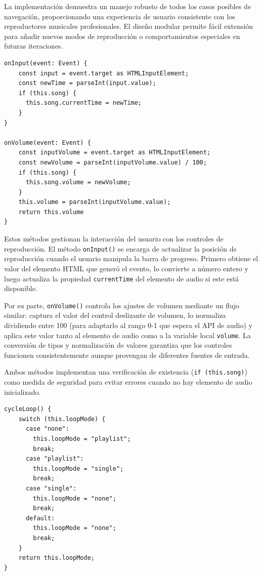 \documentclass[11pt, a4paper]{article}
\begin{document}
                La implementación demuestra un manejo robusto de todos los casos posibles de navegación, proporcionando una experiencia de usuario consistente con los reproductores musicales profesionales. El diseño modular permite fácil extensión para añadir nuevos modos de reproducción o comportamientos especiales en futuras iteraciones.

                \begin{lstlisting}[caption={Control de tiempo y volumen}]
onInput(event: Event) {
    const input = event.target as HTMLInputElement;
    const newTime = parseInt(input.value);
    if (this.song) {
      this.song.currentTime = newTime;
    }
}

onVolume(event: Event) {
    const inputVolume = event.target as HTMLInputElement;
    const newVolume = parseInt(inputVolume.value) / 100;
    if (this.song) {
      this.song.volume = newVolume;
    }
    this.volume = parseInt(inputVolume.value);
    return this.volume
}
                \end{lstlisting}

                Estos métodos gestionan la interacción del usuario con los controles de reproducción. El método \verb|onInput()| se encarga de actualizar la posición de reproducción cuando el usuario manipula la barra de progreso. Primero obtiene el valor del elemento HTML que generó el evento, lo convierte a número entero y luego actualiza la propiedad \verb|currentTime| del elemento de audio si este está disponible.

                Por su parte, \verb|onVolume()| controla los ajustes de volumen mediante un flujo similar: captura el valor del control deslizante de volumen, lo normaliza dividiendo entre 100 (para adaptarlo al rango 0-1 que espera el API de audio) y aplica este valor tanto al elemento de audio como a la variable local \verb|volume|. La conversión de tipos y normalización de valores garantiza que los controles funcionen consistentemente aunque provengan de diferentes fuentes de entrada.

                Ambos métodos implementan una verificación de existencia (\verb|if (this.song)|) como medida de seguridad para evitar errores cuando no hay elemento de audio inicializado.

                \begin{lstlisting}[caption={cycleLoop()}]
cycleLoop() {
    switch (this.loopMode) {
      case "none":
        this.loopMode = "playlist";
        break;
      case "playlist":
        this.loopMode = "single";
        break;
      case "single":
        this.loopMode = "none";
        break;
      default:
        this.loopMode = "none";
        break;
    }
    return this.loopMode;
}
                \end{lstlisting}
\end{document}
